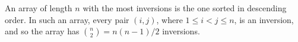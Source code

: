 An array of length $n$ with the most inversions is the one sorted in descending order.
In such an array, every pair $(i,j)$, where $1\le i<j\le n$, is an inversion, and so the array has $\binom{n}{2}=n(n-1)/2$ inversions.
